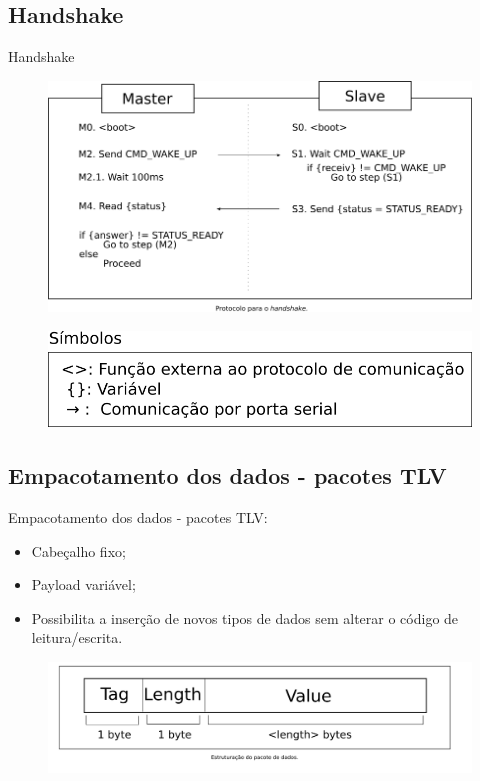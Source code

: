 \documentclass{beamer}
\begin{document}
\subsection{Handshake}
\begin{frame}
  \centering
  Handshake
    \begin{figure}
    \centering
    \includegraphics[width=0.5\linewidth]{handshake}
  \end{figure}
   \begin{figure}
    \centering
    \includegraphics[width=0.5\linewidth]{legenda}
  \end{figure}
\end{frame}

\subsection{Empacotamento dos dados - pacotes TLV}
\begin{frame}
  \centering
  Empacotamento dos dados - pacotes TLV:
    \begin{itemize}
        \item Cabeçalho fixo;
        \item Payload variável;
        \item Possibilita a inserção de novos tipos de dados sem alterar o código de leitura/escrita.
    \end{itemize}
    \begin{figure}
    \centering
    \includegraphics[width=0.9\linewidth]{tlv}
  \end{figure}
\end{frame}
\end{document}
